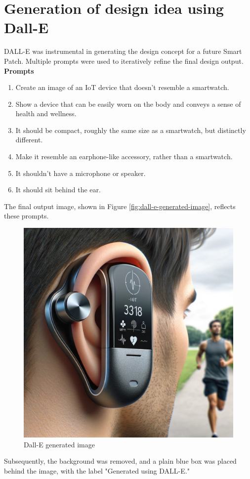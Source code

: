 \chapter{Generation of design idea using Dall-E}
\label{chatgpt-prompts}

DALL-E was instrumental in generating the design concept for a future Smart Patch. Multiple prompts were used to iteratively refine the final design output. \\

\noindent \textbf{Prompts}\\
\begin{enumerate}
    \item Create an image of an IoT device that doesn't resemble a smartwatch.
    \item Show a device that can be easily worn on the body and conveys a sense of health and wellness.
    \item It should be compact, roughly the same size as a smartwatch, but distinctly different.
    \item Make it resemble an earphone-like accessory, rather than a smartwatch.
    \item It shouldn't have a microphone or speaker.
    \item It should sit behind the ear.
\end{enumerate}

The final output image, shown in Figure \ref{fig:dall-e-generated-image}, reflects these prompts.

\begin{figure}
    \centering
    \includegraphics[width=1\linewidth]{images/image-chatgpt.png}
    \caption{Dall-E generated image}
    \label{fig:dall-e generated image}
\end{figure}


Subsequently, the background was removed, and a plain blue box was placed behind the image, with the label "Generated using DALL-E."


